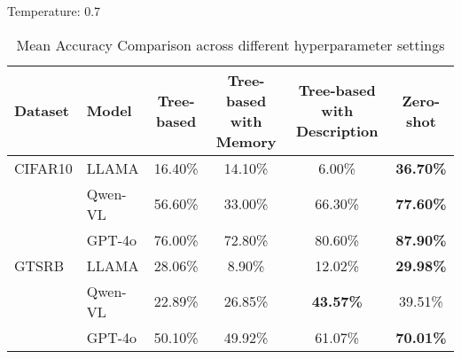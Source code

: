 Temperature: 0.7
\begin{table*}[ht]
\centering
\caption{Mean Accuracy Comparison across different hyperparameter settings}
\begin{tabular}{llcccc}
\hline
\textbf{Dataset} & \textbf{Model} & \textbf{Tree-based} & \textbf{Tree-based with Memory} & \textbf{Tree-based with Description} & \textbf{Zero-shot} \\ \hline
CIFAR10 & LLAMA & 16.40\% & 14.10\% & 6.00\% & \textbf{36.70\%} \\
      & Qwen-VL & 56.60\% & 33.00\% & 66.30\% & \textbf{77.60\%} \\
      & GPT-4o & 76.00\% & 72.80\% & 80.60\% & \textbf{87.90\%} \\
\hline
GTSRB & LLAMA & 28.06\% & 8.90\% & 12.02\% & \textbf{29.98\%} \\
      & Qwen-VL & 22.89\% & 26.85\% & \textbf{43.57\%} & 39.51\% \\
      & GPT-4o & 50.10\% & 49.92\% & 61.07\% & \textbf{70.01\%} \\
\hline
\end{tabular}
\label{tab:accuracy_comparison_hyperparams}
\end{table*}